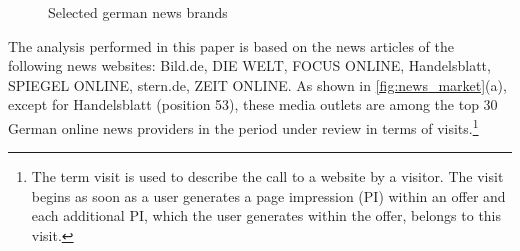 \documentclass[
  12pt,
]{article}
\begin{document}
\begin{figure}

{\centering {}

}

\caption{Selected german news brands \label{fig:news_market}}\label{fig:unnamed-chunk-1}
\end{figure}

The analysis performed in this paper is based on the news articles of
the following news websites: Bild.de, DIE WELT, FOCUS ONLINE,
Handelsblatt, SPIEGEL ONLINE, stern.de, ZEIT ONLINE. As shown in
\autoref{fig:news_market}(a), except for Handelsblatt (position 53),
these media outlets are among the top 30 German online news providers in
the period under review in terms of visits.\footnote{The term visit is
  used to describe the call to a website by a visitor. The visit begins
  as soon as a user generates a page impression (PI) within an offer and
  each additional PI, which the user generates within the offer, belongs
  to this visit.}
\end{document}
